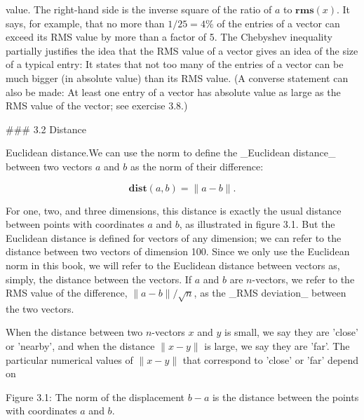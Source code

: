 value. The right-hand side is the inverse square of the ratio of \(a\) to \(\mathbf{rms}(x)\). It says, for example, that no more than \(1/25=4\%\) of the entries of a vector can exceed its RMS value by more than a factor of 5. The Chebyshev inequality partially justifies the idea that the RMS value of a vector gives an idea of the size of a typical entry: It states that not too many of the entries of a vector can be much bigger (in absolute value) than its RMS value. (A converse statement can also be made: At least one entry of a vector has absolute value as large as the RMS value of the vector; see exercise 3.8.)

### 3.2 Distance

Euclidean distance.We can use the norm to define the _Euclidean distance_ between two vectors \(a\) and \(b\) as the norm of their difference:

\[\mathbf{dist}(a,b)=\|a-b\|.\]

For one, two, and three dimensions, this distance is exactly the usual distance between points with coordinates \(a\) and \(b\), as illustrated in figure 3.1. But the Euclidean distance is defined for vectors of any dimension; we can refer to the distance between two vectors of dimension 100. Since we only use the Euclidean norm in this book, we will refer to the Euclidean distance between vectors as, simply, the distance between the vectors. If \(a\) and \(b\) are \(n\)-vectors, we refer to the RMS value of the difference, \(\|a-b\|/\sqrt{n}\), as the _RMS deviation_ between the two vectors.

When the distance between two \(n\)-vectors \(x\) and \(y\) is small, we say they are 'close' or 'nearby', and when the distance \(\|x-y\|\) is large, we say they are 'far'. The particular numerical values of \(\|x-y\|\) that correspond to 'close' or 'far' depend on

Figure 3.1: The norm of the displacement \(b-a\) is the distance between the points with coordinates \(a\) and \(b\).

 